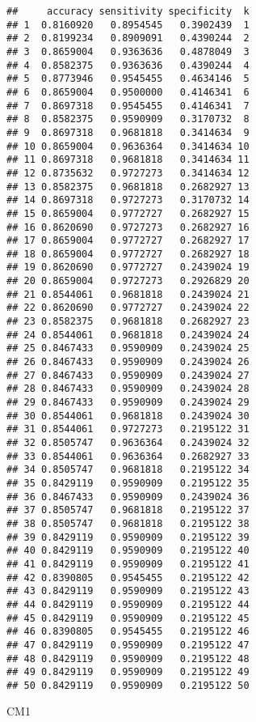 \documentclass[]{article}
\newenvironment{Shaded}{\begin{snugshade}}{\end{snugshade}}
\newcommand{\NormalTok}[1]{#1}
\begin{document}
\begin{verbatim}
##     accuracy sensitivity specificity  k
## 1  0.8160920   0.8954545   0.3902439  1
## 2  0.8199234   0.8909091   0.4390244  2
## 3  0.8659004   0.9363636   0.4878049  3
## 4  0.8582375   0.9363636   0.4390244  4
## 5  0.8773946   0.9545455   0.4634146  5
## 6  0.8659004   0.9500000   0.4146341  6
## 7  0.8697318   0.9545455   0.4146341  7
## 8  0.8582375   0.9590909   0.3170732  8
## 9  0.8697318   0.9681818   0.3414634  9
## 10 0.8659004   0.9636364   0.3414634 10
## 11 0.8697318   0.9681818   0.3414634 11
## 12 0.8735632   0.9727273   0.3414634 12
## 13 0.8582375   0.9681818   0.2682927 13
## 14 0.8697318   0.9727273   0.3170732 14
## 15 0.8659004   0.9772727   0.2682927 15
## 16 0.8620690   0.9727273   0.2682927 16
## 17 0.8659004   0.9772727   0.2682927 17
## 18 0.8659004   0.9772727   0.2682927 18
## 19 0.8620690   0.9772727   0.2439024 19
## 20 0.8659004   0.9727273   0.2926829 20
## 21 0.8544061   0.9681818   0.2439024 21
## 22 0.8620690   0.9772727   0.2439024 22
## 23 0.8582375   0.9681818   0.2682927 23
## 24 0.8544061   0.9681818   0.2439024 24
## 25 0.8467433   0.9590909   0.2439024 25
## 26 0.8467433   0.9590909   0.2439024 26
## 27 0.8467433   0.9590909   0.2439024 27
## 28 0.8467433   0.9590909   0.2439024 28
## 29 0.8467433   0.9590909   0.2439024 29
## 30 0.8544061   0.9681818   0.2439024 30
## 31 0.8544061   0.9727273   0.2195122 31
## 32 0.8505747   0.9636364   0.2439024 32
## 33 0.8544061   0.9636364   0.2682927 33
## 34 0.8505747   0.9681818   0.2195122 34
## 35 0.8429119   0.9590909   0.2195122 35
## 36 0.8467433   0.9590909   0.2439024 36
## 37 0.8505747   0.9681818   0.2195122 37
## 38 0.8505747   0.9681818   0.2195122 38
## 39 0.8429119   0.9590909   0.2195122 39
## 40 0.8429119   0.9590909   0.2195122 40
## 41 0.8429119   0.9590909   0.2195122 41
## 42 0.8390805   0.9545455   0.2195122 42
## 43 0.8429119   0.9590909   0.2195122 43
## 44 0.8429119   0.9590909   0.2195122 44
## 45 0.8429119   0.9590909   0.2195122 45
## 46 0.8390805   0.9545455   0.2195122 46
## 47 0.8429119   0.9590909   0.2195122 47
## 48 0.8429119   0.9590909   0.2195122 48
## 49 0.8429119   0.9590909   0.2195122 49
## 50 0.8429119   0.9590909   0.2195122 50
\end{verbatim}

\begin{Shaded}
\begin{Highlighting}[]
\NormalTok{CM1}
\end{Highlighting}
\end{Shaded}
\end{document}
